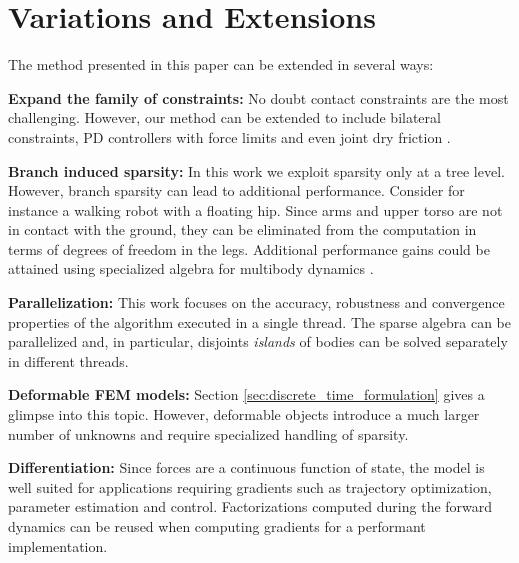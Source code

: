 \section{Variations and Extensions}
\label{sec:variations_and_extensions}

The method presented in this paper can be extended in several ways:

\textbf{Expand the family of constraints:} No doubt contact constraints are the most challenging. However, our method can be extended to include bilateral constraints, PD controllers with force limits and even joint dry friction \cite{bib:todorov2014}.

\textbf{Branch induced sparsity:} In this work we exploit sparsity only at a tree level. However, branch sparsity can lead to additional performance. Consider for instance a walking robot with a floating hip. Since arms and upper torso are not in contact with the ground, they can be eliminated from the computation in terms of degrees of freedom in the legs. Additional performance gains could be attained using specialized algebra for multibody dynamics \cite{bib:carpentier2021}.

\textbf{Parallelization:} This work focuses on the accuracy, robustness and convergence properties of the algorithm executed in a single thread. The sparse algebra can be parallelized and, in particular, disjoints \emph{islands} of bodies can be solved separately in different threads.

\textbf{Deformable FEM models:} Section \ref{sec:discrete_time_formulation} gives a glimpse into this topic. However, deformable objects introduce a much larger number of unknowns and require specialized handling of sparsity.

\textbf{Differentiation:} Since forces are a continuous function of state, the model is well suited for applications requiring gradients such as trajectory optimization, parameter estimation and control. Factorizations computed during the forward dynamics can be reused when computing gradients for a performant implementation.

